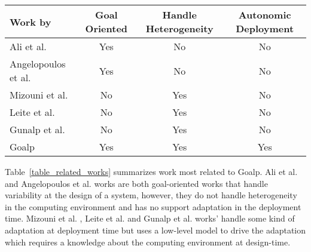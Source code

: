 \begin{table*}[!ht]
\centering
\caption{Comparing characteristic properties of selected approaches related to Goalp}
\label{table_related_works}
\begin{tabular}{p{4cm} ccc}
\toprule
Work by &
   Goal Oriented &
    Handle Heterogeneity &
    Autonomic Deployment \\
\midrule
Ali et al.\citep{ali_requirements-driven_2014} & \cellcolor{blue!10} Yes & No & No \\
Angelopoulos et al. \cite{angelopoulos_capturing_2015} & \cellcolor{blue!10}Yes & No & No \\
Mizouni et al. \citep{mizouni_framework_2014} & No & \cellcolor{blue!10} Yes & No \\
Leite et al. \citep{ferreira_leite_user_2014}  & No & \cellcolor{blue!10} Yes & No \\
Gunalp et al.\citep{gunalp_rondo_2015} & No & \cellcolor{blue!10} Yes  &  No\\
Goalp & \cellcolor{blue!10} Yes & \cellcolor{blue!10} Yes & \cellcolor{blue!10} Yes \\
\bottomrule
\end{tabular}
\end{table*}

Table~\ref{table_related_works} summarizes work most related to Goalp. Ali et al.\citep{ali_requirements-driven_2014} and Angelopoulos et al. \cite{angelopoulos_capturing_2015} works are both goal-oriented works that handle variability at the design of a system, however, they do not handle heterogeneity in the computing environment and has no support adaptation in the deployment time. Mizouni et al. \citep{mizouni_framework_2014}, Leite et al. \citep{ferreira_leite_user_2014} and Gunalp et al.\citep{gunalp_rondo_2015} works' handle some kind of adaptation at deployment time but uses a low-level model to drive the adaptation which requires a knowledge about the computing environment at design-time.


